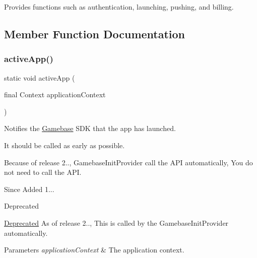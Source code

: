 Provides functions such as authentication, launching, pushing, and billing. 

\subsection{Member Function Documentation}
\mbox{\label{classcom_1_1toast_1_1android_1_1gamebase_1_1_gamebase_a07fe4c62c585e8af9f924935e813ff12}} 
\subsubsection{\texorpdfstring{active\+App()}{activeApp()}}
{\footnotesize\ttfamily static void active\+App (\begin{DoxyParamCaption}\item[{final Context}]{application\+Context }\end{DoxyParamCaption})\hspace{0.3cm}{\ttfamily [static]}}



Notifies the \hyperlink{classcom_1_1toast_1_1android_1_1gamebase_1_1_gamebase}{Gamebase} S\+DK that the app has launched. 

It should be called as early as possible.

Because of release 2.., Gamebase\+Init\+Provider call the A\+PI automatically, You do not need to call the A\+PI.

\begin{DoxySince}{Since}
Added 1... 
\end{DoxySince}
\begin{DoxyRefDesc}{Deprecated}
\item[\hyperlink{deprecated__deprecated000001}{Deprecated}]As of release 2.., This is called by the Gamebase\+Init\+Provider automatically. \end{DoxyRefDesc}

\begin{DoxyParams}{Parameters}
{\em application\+Context} & The application context. \\
\hline
\end{DoxyParams}

